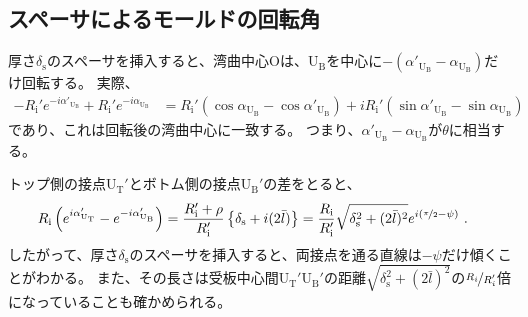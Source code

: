 \subsection{スペーサによるモールドの回転角}
厚さ$\delta_\mathrm s$のスペーサを挿入すると、湾曲中心Oは、U$_\mathrm B$を中心に$-\left(\alpha'_{\mathrm U_\mathrm B}\!-\alpha_{\mathrm U_\mathrm B}\right)$だけ回転する。
実際、
\begin{align*}
  -R_\mathrm i'e^{-i\alpha'_{\mathrm U_\mathrm B}}+R_\mathrm i'e^{-i\alpha_{\mathrm U_\mathrm B}}
  &= R_\mathrm i'(\cos\alpha_{\mathrm U_\mathrm B}-\cos\alpha'_{\mathrm U_\mathrm B})
     +iR_\mathrm i'(\sin\alpha'_{\mathrm U_\mathrm B}-\sin\alpha_{\mathrm U_\mathrm B})
\end{align*}
であり、これは回転後の湾曲中心に一致する。
つまり、$\alpha'_{\mathrm U_\mathrm B}\!-\alpha_{\mathrm U_\mathrm B}$が$\theta$に相当する。
\begin{hosoku}
トップ側の接点U$_\mathrm T'$とボトム側の接点U$_\mathrm B'$の差をとると、
\begin{align*}
  R_\mathrm i\left(e^{i\alpha_{\mathrm U_\mathrm T}'}-e^{-i\alpha'_{\mathrm U_\mathrm B}}\right)
  &= \frac{R_\mathrm i'+\rho}{R_\mathrm i'}\left\{\delta_\mathrm s+i(2\bar l)\right\}
   = \frac{R_\mathrm i}{R_\mathrm i'}\sqrt{\delta_\mathrm s^2+(2\bar l)^2}e^{i(\nicefrac\pi2-\psi)}\ .
\end{align*}
したがって、厚さ$\delta_\mathrm s$のスペーサを挿入すると、両接点を通る直線は$-\psi$だけ傾くことがわかる。
また、その長さは受板中心間U$_\mathrm T'$U$_\mathrm B'$の距離$\sqrt{\delta_\mathrm s^2+(2\bar l)^2}$の$\nicefrac{R_i}{R_i'}$倍になっていることも確かめられる。
\end{hosoku}


